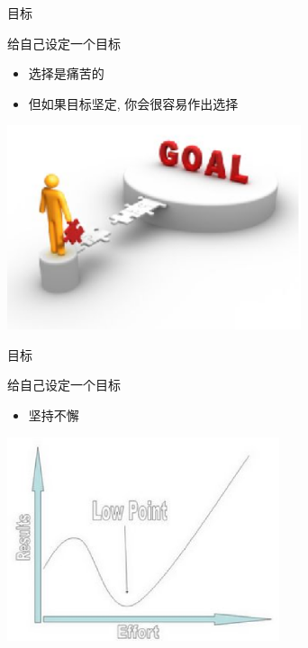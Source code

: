\documentclass[dvipdfm]{beamer}
\begin{document}
\begin{frame}[t]{目标}
  \begin{block}{给自己设定一个目标}
    \begin{itemize}
    \item 选择是痛苦的 \pause
    \item 但如果目标坚定, 你会很容易作出选择 \pause
    \end{itemize}
  \end{block}
  \begin{center}
  \centering \includegraphics[height=6cm]{figure/goal.eps}
  \end{center}
\end{frame}
\begin{frame}[t]{目标}
  \begin{block}{给自己设定一个目标}
    \begin{itemize}
    \item 坚持不懈 \pause
    \end{itemize}
  \end{block}
  \begin{center}
  \centering \includegraphics[height=6cm]{figure/effortandresult.eps}
  \end{center}
\end{frame}
\end{document}
